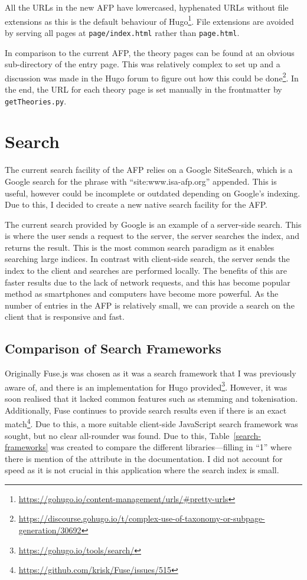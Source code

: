 \documentclass[bsc,frontabs,oneside,singlespacing,parskip,deptreport,logo]{infthesis}
\begin{document}
All the URLs in the new AFP have lowercased, hyphenated URLs without file extensions as this is the default behaviour of Hugo\footnote{\url{https://gohugo.io/content-management/urls/\#pretty-urls}}. File extensions are avoided by serving all pages at \texttt{page/index.html} rather than \texttt{page.html}.

In comparison to the current AFP, the theory pages can be found at an obvious sub-directory of the entry page. This was relatively complex to set up and a discussion was made in the Hugo forum to figure out how this could be done\footnote{\url{https://discourse.gohugo.io/t/complex-use-of-taxonomy-or-subpage-generation/30692}}. In the end, the URL for each theory page is set manually in the frontmatter by \texttt{getTheories.py}.

\cbend
\section{Search}

The current search facility of the AFP relies on a Google SiteSearch, which is a Google search for the phrase with ``site:www.isa-afp.org'' appended. \cbstart This is useful, however could be incomplete or outdated depending on Google's indexing. Due to this, I decided to create a new native search facility for the AFP\@.

The current search provided by Google is an example of a server-side search. This is where the user sends a request to the server, the server searches the index, and returns the result. This is the most common search paradigm as it enables searching large indices. In contrast with client-side search, the server sends the index to the client and searches are performed locally. The benefits of this are faster results due to the lack of network requests, and this has become popular method as smartphones and computers have become more powerful. As the number of entries in the AFP is relatively small, we can provide a search on the client that is responsive and fast.
\cbend
\subsection{Comparison of Search Frameworks}
\cbstart
Originally Fuse.js was chosen as it was a search framework that I was previously aware of, and there is an implementation for Hugo provided\footnote{\url{https://gohugo.io/tools/search/}}. However, it was soon realised that it lacked common features such as stemming and tokenisation. Additionally, Fuse continues to provide search results even if there is an exact match\footnote{\url{https://github.com/krisk/Fuse/issues/515}}. Due to this, a more suitable client-side JavaScript search framework was sought, but no clear all-rounder was found. Due to this, Table~\ref{search-frameworks} was created to compare the different libraries---filling in ``1'' where there is mention of the attribute in the documentation. I did not account for speed as it is not crucial in this application where the search index is small. \cbend
\end{document}
